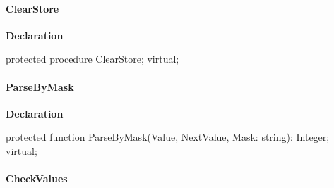 \documentclass{report}
\newif\ifpdf
\begin{document}
\paragraph*{ClearStore}\hspace*{\fill}

\label{ftpsend.TFTPList-ClearStore}
\begin{list}{}{
\setlength{\itemindent}{0cm}
\setlength{\listparindent}{0cm}
\setlength{\leftmargin}{\evensidemargin}
\addtolength{\leftmargin}{\tmplength}
\settowidth{\labelsep}{X}
\addtolength{\leftmargin}{\labelsep}
\setlength{\labelwidth}{\tmplength}
}
\item[\textbf{Declaration}\hfill]
\ifpdf
\begin{flushleft}
\fi
\begin{ttfamily}
protected procedure ClearStore; virtual;\end{ttfamily}

\ifpdf
\end{flushleft}
\fi

\end{list}
\paragraph*{ParseByMask}\hspace*{\fill}

\label{ftpsend.TFTPList-ParseByMask}
\begin{list}{}{
\setlength{\itemindent}{0cm}
\setlength{\listparindent}{0cm}
\setlength{\leftmargin}{\evensidemargin}
\addtolength{\leftmargin}{\tmplength}
\settowidth{\labelsep}{X}
\addtolength{\leftmargin}{\labelsep}
\setlength{\labelwidth}{\tmplength}
}
\item[\textbf{Declaration}\hfill]
\ifpdf
\begin{flushleft}
\fi
\begin{ttfamily}
protected function ParseByMask(Value, NextValue, Mask: string): Integer; virtual;\end{ttfamily}

\ifpdf
\end{flushleft}
\fi

\end{list}
\paragraph*{CheckValues}\hspace*{\fill}
\end{document}
